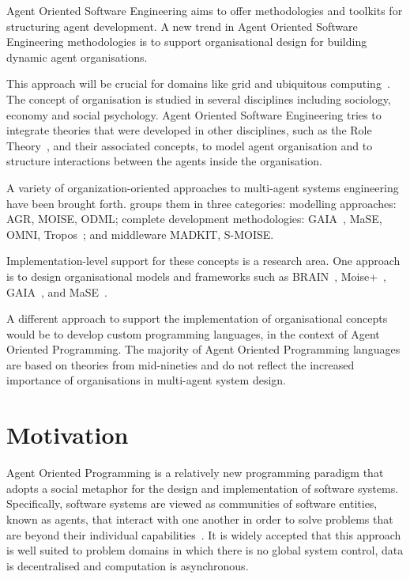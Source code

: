 \documentclass[a4paper,12pt,oneside,fleqn]{book} %
\begin{document}
Agent Oriented Software Engineering aims to offer methodologies and
toolkits for structuring agent development. A new trend in Agent Oriented
Software Engineering methodologies is to support organisational design for
building dynamic agent organisations.

This approach will be crucial for domains like grid and ubiquitous
computing~\cite{luck2005agent}. The concept of organisation is studied in
several disciplines including sociology, economy and social psychology.
Agent Oriented Software Engineering tries to integrate theories that were
developed in other disciplines, such as the Role
Theory~\cite{biddle1986recent}, and their associated concepts, to model
agent organisation and to structure interactions between the agents inside
the organisation. 



A variety of organization-oriented approaches to multi-agent systems
engineering have been brought forth. \cite{DBLP:conf/se/Wester-EbbinghausMRM07} groups them in three categories: modelling
approaches: AGR, MOISE, ODML; complete development methodologies:
GAIA~\cite{DBLP:journals/tosem/ZambonelliJW03}, MaSE,
OMNI, Tropos~\cite{DBLP:conf/aose/GiunchigliaMP02}; and middleware MADKIT, S-MOISE.

Implementation-level support for these concepts is a research area. One
approach is to design organisational models and frameworks such as
BRAIN~\cite{DBLP:conf/coopis/CabriLZ03},
Moise+~\cite{DBLP:conf/atal/HubnerSB02},
GAIA~\cite{DBLP:journals/aamas/WooldridgeJK00}, and
MaSE~\cite{deloach2001analysis}.

A different approach to support the implementation of organisational
concepts would be to develop custom programming languages, in the context
of Agent Oriented Programming. The majority of Agent Oriented Programming
languages are based on theories from mid-nineties and do not reflect the
increased importance of organisations in multi-agent system design.
\section{Motivation}
Agent Oriented Programming is a relatively new programming paradigm that
adopts a social metaphor for the design and implementation of software
systems.  Specifically, software systems are viewed as communities of
software entities, known as agents, that interact with one another in order
to solve problems that are beyond their individual
capabilities~\cite{DBLP:journals/ai/Shoham93}. It is widely accepted that
this approach is well suited to problem domains in which there is no global
system control, data is decentralised and computation is asynchronous.
\end{document}
